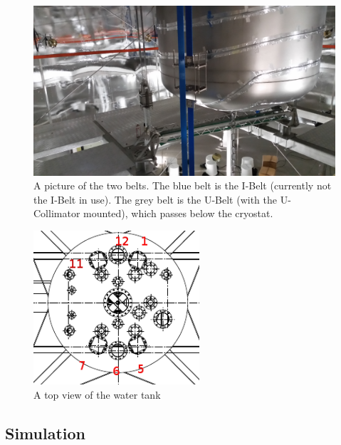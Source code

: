 \begin{figure}
	\begin{center}
	\includegraphics[width=\textwidth]{figs/IUBeltPic.jpg}%
		\caption{\label{fig:IUBeltpic}A picture of the two belts. The blue belt is the I-Belt (currently not the I-Belt in use). The grey belt is the U-Belt (with the U-Collimator mounted), which passes below the cryostat.}
		\end{center}
\end{figure}



\begin{figure}
	\begin{center}
	\includegraphics[width=0.55\textwidth]{figs/waterTankTopView.png}%
		\caption{\label{fig:topFlange} A top view of the water tank }
		\end{center}
	
	\end{figure}
\subsection{Simulation} \label{subsec:simulation}

